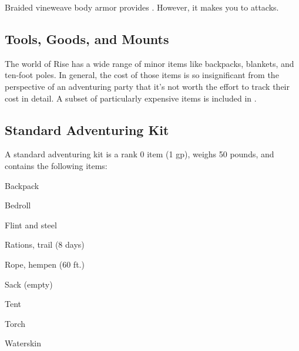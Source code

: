        Braided vineweave body armor provides  .
      However, it makes you \vulnerable to \atFire attacks.

  \begin{longcolumn}
    \section{Tools, Goods, and Mounts}
      \begin{longtablepreface}

        The world of Rise has a wide range of minor items like backpacks, blankets, and ten-foot poles.
        In general, the cost of those items is so insignificant from the perspective of an adventuring party that it's not worth the effort to track their cost in detail.
        A subset of particularly expensive items is included in .

        \subsection{Standard Adventuring Kit}\label{Standard Adventuring Kit}
          A standard adventuring kit is a rank 0 item (1 gp), weighs 50 pounds, and contains the following items:
          \begin{raggeditemize}
            \item Backpack
            \item Bedroll
            \item Flint and steel
            \item Rations, trail (8 days)
            \item Rope, hempen (60 ft.)
            \item Sack (empty)
            \item Tent
            \item Torch
            \item Waterskin
          \end{raggeditemize}
      \end{longtablepreface}

      
  \end{longcolumn}

